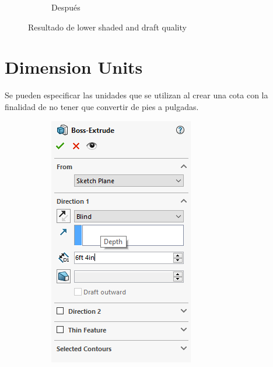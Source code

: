 \documentclass{report}
\begin{document}
\begin{figure}[H]
\begin{subfigure}[b]{0.45\textwidth}
		\caption{Después}
		\label{fig:solidworksmacro16}
	\end{subfigure}
	\caption{Resultado de lower shaded and draft quality}
\end{figure}

\chapter{Dimension Units}

Se pueden especificar las unidades que se utilizan al crear una cota con la finalidad de no tener que convertir de pies a pulgadas.

\begin{figure}[H]
	\centering
	\begin{subfigure}[b]{0.45\textwidth}
		\includegraphics[width=\textwidth]{Imagenes/solidworks_feetin01}

\end{subfigure}
\end{figure}
\end{document}
